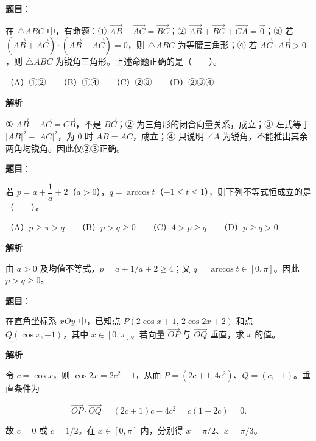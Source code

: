 \begin{answer}

\textbf{题目}：

在 $\triangle ABC$ 中，有命题：① $\overrightarrow{AB}-\overrightarrow{AC}=\overrightarrow{BC}$；② $\overrightarrow{AB}+\overrightarrow{BC}+\overrightarrow{CA}=\vec{0}$；③ 若 $(\overrightarrow{AB}+\overrightarrow{AC})\cdot(\overrightarrow{AB}-\overrightarrow{AC})=0$，则 $\triangle ABC$ 为等腰三角形；④ 若 $\overrightarrow{AC}\cdot\overrightarrow{AB}>0$，则 $\triangle ABC$ 为锐角三角形。上述命题正确的是\mbox{（　　）}。

（A）①②　　（B）①④　　（C）②③　　（D）②③④

\textbf{解析}

① $\overrightarrow{AB}-\overrightarrow{AC}=\overrightarrow{CB}$，不是 $\overrightarrow{BC}$；② 为三角形的闭合向量关系，成立；③ 左式等于 $|AB|^2-|AC|^2$，为 $0$ 时 $AB=AC$，成立；④ 只说明 $\angle A$ 为锐角，不能推出其余两角均锐角。因此仅②③正确。


\end{answer}
\begin{answer}

\textbf{题目}：

若 $p=a+\dfrac{1}{a}+2$（$a>0$），$q=\arccos t$（$-1\le t\le1$），则下列不等式恒成立的是\mbox{（　　）}。

（A）$p\ge\pi>q$　　（B）$p>q\ge0$　　（C）$4>p\ge q$　　（D）$p\ge q>0$

\textbf{解析}

由 $a>0$ 及均值不等式，$p=a+1/a+2\ge4$；又 $q=\arccos t\in[0,\pi]$。因此 $p>q\ge0$。


\end{answer}
\begin{answer}

\textbf{题目}：

在直角坐标系 $xOy$ 中，已知点 $P(2\cos x+1,\,2\cos 2x+2)$ 和点 $Q(\cos x,-1)$，其中 $x\in[0,\pi]$。若向量 $\overrightarrow{OP}$ 与 $\overrightarrow{OQ}$ 垂直，求 $x$ 的值。

\textbf{解析}

令 $c=\cos x$，则 $\cos2x=2c^2-1$，从而 $P=(2c+1,4c^2)$、$Q=(c,-1)$。垂直条件为

\nopagebreak[4]
\[\overrightarrow{OP}\cdot\overrightarrow{OQ}=(2c+1)c-4c^2=c(1-2c)=0.\]

故 $c=0$ 或 $c=1/2$。在 $x\in[0,\pi]$ 内，分别得 $x=\pi/2$、$x=\pi/3$。


\end{answer}
